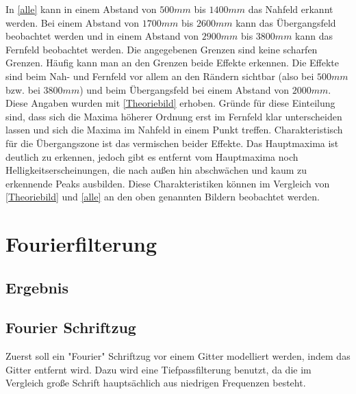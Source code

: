 In \cref{alle} kann in einem Abstand von $500 mm$ bis $1400 mm$ das Nahfeld erkannt werden. Bei einem Abstand von $1700 mm$ bis $2600 mm$  kann das Übergangsfeld beobachtet werden und in einem Abstand von $2900 mm$ bis $3800 mm$ kann das Fernfeld beobachtet werden. Die angegebenen Grenzen sind keine scharfen Grenzen. Häufig kann man an den Grenzen beide Effekte erkennen. Die Effekte sind beim Nah- und Fernfeld vor allem an den Rändern sichtbar (also bei $500 mm$ bzw. bei $3800 mm$) und beim Übergangsfeld bei einem Abstand von $2000 mm$. Diese Angaben wurden mit \cref{Theoriebild} erhoben. Gründe für diese Einteilung sind, dass sich die Maxima höherer Ordnung erst im Fernfeld klar unterscheiden lassen und sich die Maxima im Nahfeld in einem Punkt treffen. Charakteristisch für die Übergangszone ist das vermischen beider Effekte. Das Hauptmaxima ist deutlich zu erkennen, jedoch gibt es entfernt vom Hauptmaxima noch Helligkeitserscheinungen, die nach außen hin abschwächen und kaum zu erkennende Peaks ausbilden. Diese Charakteristiken können im Vergleich von \cref{Theoriebild} und \cref{alle} an den oben genannten Bildern beobachtet werden.

\section{Fourierfilterung}
\subsection{Ergebnis}
\subsection{Fourier Schriftzug}
Zuerst soll ein "Fourier" Schriftzug vor einem Gitter modelliert werden, indem das Gitter entfernt wird. Dazu wird eine Tiefpassfilterung benutzt, da die im Vergleich große Schrift hauptsächlich aus niedrigen Frequenzen besteht. 


